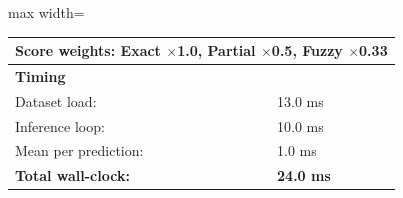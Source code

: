 \begin{table}[htbp]
\begin{adjustbox}{max width=\textwidth}
\begin{tabular}{r p{5cm} r r r r}
\multicolumn{6}{l}{Score weights: Exact $\times$1.0, Partial $\times$0.5, Fuzzy $\times$0.33} \\
\midrule
\multicolumn{6}{l}{\textbf{Timing}} \\
\midrule
\multicolumn{3}{l}{Dataset load:} & \multicolumn{3}{l}{13.0 ms} \\
\multicolumn{3}{l}{Inference loop:} & \multicolumn{3}{l}{10.0 ms} \\
\multicolumn{3}{l}{Mean per prediction:} & \multicolumn{3}{l}{1.0 ms} \\
\multicolumn{3}{l}{\textbf{Total wall-clock:}} & \multicolumn{3}{l}{\textbf{24.0 ms}} \\
\bottomrule
\end{tabular}
\end{adjustbox}
\end{table}
